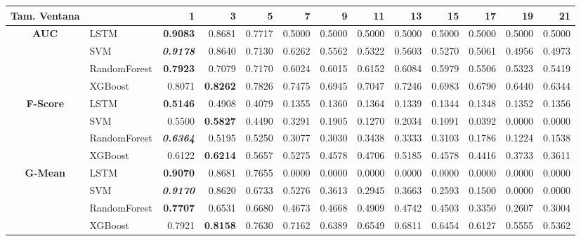 \begin{table}[H]
\centering
\begin{adjustbox}{max width=12cm}
	\begin{tabular}{|c|l|r|r|r|r|r|r|r|r|r|r|r|}
		\hline
		\textbf{Tam. Ventana} &         &      1  &      3  &      5  &      7  &      9  &      11 &      13 &      15 &      17 &      19 &      21 \\
		\hline
		\textbf{AUC} &  LSTM & \textbf{  0.9083 } &  0.8681 &  0.7717 &  0.5000 &  0.5000 &  0.5000 &  0.5000 &  0.5000 &  0.5000 &  0.5000 &  0.5000 \\
		&  SVM & \textit{ \textbf{  0.9178 } } &  0.8640 &  0.7130 &  0.6262 &  0.5562 &  0.5322 &  0.5603 &  0.5270 &  0.5061 &  0.4956 &  0.4973 \\
		&  RandomForest & \textbf{  0.7923 } &  0.7079 &  0.7170 &  0.6024 &  0.6015 &  0.6152 &  0.6084 &  0.5979 &  0.5506 &  0.5323 &  0.5419 \\
		&  XGBoost &  0.8071 & \textbf{  0.8262 } &  0.7826 &  0.7475 &  0.6945 &  0.7047 &  0.7246 &  0.6983 &  0.6790 &  0.6440 &  0.6344 \\
		\hline
		\textbf{F-Score} &  LSTM & \textbf{  0.5146 } &  0.4908 &  0.4079 &  0.1355 &  0.1360 &  0.1364 &  0.1339 &  0.1344 &  0.1348 &  0.1352 &  0.1356 \\
		&  SVM &  0.5500 & \textbf{  0.5827 } &  0.4490 &  0.3291 &  0.1905 &  0.1270 &  0.2034 &  0.1091 &  0.0392 &  0.0000 &  0.0000 \\
		&  RandomForest & \textit{ \textbf{  0.6364 } } &  0.5195 &  0.5250 &  0.3077 &  0.3030 &  0.3438 &  0.3333 &  0.3103 &  0.1786 &  0.1224 &  0.1538 \\
		&  XGBoost &  0.6122 & \textbf{  0.6214 } &  0.5657 &  0.5275 &  0.4578 &  0.4706 &  0.5185 &  0.4578 &  0.4416 &  0.3733 &  0.3611 \\
		\hline
		\textbf{G-Mean} &  LSTM & \textbf{  0.9070 } &  0.8681 &  0.7655 &  0.0000 &  0.0000 &  0.0000 &  0.0000 &  0.0000 &  0.0000 &  0.0000 &  0.0000 \\
		&  SVM & \textit{ \textbf{  0.9170 } } &  0.8620 &  0.6733 &  0.5276 &  0.3613 &  0.2945 &  0.3663 &  0.2593 &  0.1500 &  0.0000 &  0.0000 \\
		&  RandomForest & \textbf{  0.7707 } &  0.6531 &  0.6680 &  0.4673 &  0.4668 &  0.4909 &  0.4742 &  0.4503 &  0.3350 &  0.2607 &  0.3004 \\
		&  XGBoost &  0.7921 & \textbf{  0.8158 } &  0.7630 &  0.7162 &  0.6389 &  0.6549 &  0.6811 &  0.6454 &  0.6127 &  0.5555 &  0.5362 \\

\end{tabular}
\end{adjustbox}
\end{table}
